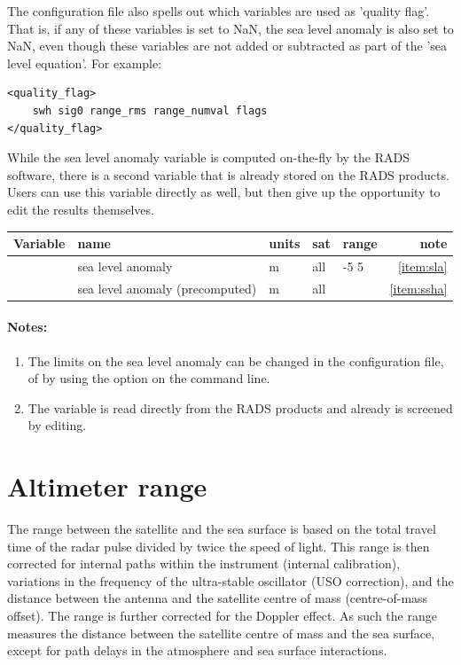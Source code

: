 \documentclass[a4paper,11pt,openany,natbib,nomargin]{thesis}
\newenvironment{vartable}{
\begin{table}[ht]
\small
\begin{tabular}{lllllr}
\hline\hline
Variable & name & units & sat & range & note \\
\hline\hline
}{
\hline
\end{tabular}
\end{table}
}
\newenvironment{notes}[1][Notes:]{\FloatBarrier\paragraph{#1}\begin{enumerate}}{\end{enumerate}}
\begin{document}
The configuration file also spells out which variables are used as 'quality flag'. That is, if any of these variables is set to NaN, the sea level anomaly is also set to NaN, even though these variables are not added or subtracted as part of the 'sea level equation'. For example:
\begin{verbatim}
<quality_flag>
    swh sig0 range_rms range_numval flags
</quality_flag>
\end{verbatim}

While the sea level anomaly variable  is computed on-the-fly by the RADS software, there is a second variable  that is already stored on the RADS products. Users can use this variable directly as well, but then give up the opportunity to edit the results themselves.

\begin{vartable}
\var{sla} & sea level anomaly & m & all & -5 5 & \ref{item:sla} \\
\var{ssha} & sea level anomaly (precomputed) & m & all & & \ref{item:ssha} \\
\end{vartable}

\begin{notes}
\item The limits on the sea level anomaly can be changed in the configuration file, of by using the  option on the command line.\label{item:sla}
\item The variable  is read directly from the RADS products and already is screened by editing.\label{item:ssha}
\end{notes}

\section{Altimeter range}
\label{var:range}
The range between the satellite and the sea surface is based on the total travel time of the radar pulse divided by twice the speed of light. This range is then corrected for internal paths within the instrument (internal calibration), variations in the frequency of the ultra-stable oscillator (USO correction), and the distance between the antenna and the satellite centre of mass (centre-of-mass offset). The range is further corrected for the Doppler effect. As such the range measures the distance between the satellite centre of mass and the sea surface, except for path delays in the atmosphere and sea surface interactions.
\end{document}
